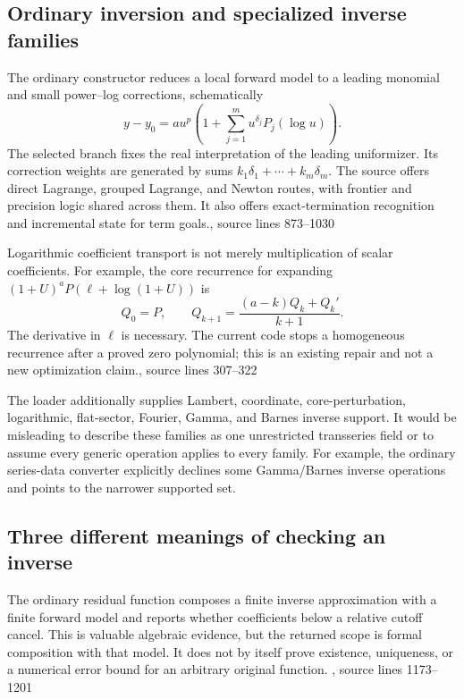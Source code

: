 \documentclass[11pt,letterpaper]{article}
\newcommand{\src}[2]{\cite{#1}, source lines #2}
\theoremstyle{definition}\newtheorem{definition}[proposition]{Definition}
\begin{document}
\subsection{Ordinary inversion and specialized inverse families}
The ordinary constructor reduces a local forward model to a leading monomial
and small power--log corrections, schematically
\begin{equation}\label{eq:inversemodel}
 y-y_0=a u^p\left(1+\sum_{j=1}^{m}u^{\delta_j}
                         P_j(\log u)\right).
\end{equation}
The selected branch fixes the real interpretation of the leading uniformizer.
Its correction weights are generated by sums $k_1\delta_1+\cdots+k_m\delta_m$.
The source offers direct Lagrange, grouped Lagrange, and Newton routes, with
frontier and precision logic shared across them. It also offers exact-termination
recognition and incremental state for term goals.\src{core}{873--1030}

Logarithmic coefficient transport is not merely multiplication of scalar
coefficients. For example, the core recurrence for expanding
$(1+U)^aP(\ell+\log(1+U))$ is
\begin{equation}
 Q_0=P,\qquad
 Q_{k+1}=\frac{(a-k)Q_k+Q_k'}{k+1}.
\end{equation}
The derivative in $\ell$ is necessary. The current code stops a homogeneous
recurrence after a proved zero polynomial; this is an existing repair and not
a new optimization claim.\src{core}{307--322}\cite{register}

The loader additionally supplies Lambert, coordinate, core-perturbation,
logarithmic, flat-sector, Fourier, Gamma, and Barnes inverse support. It would
be misleading to describe these families as one unrestricted transseries
field or to assume every generic operation applies to every family. For
example, the ordinary series-data converter explicitly declines some
Gamma/Barnes inverse operations and points to the narrower supported set.
\cite{core,operations}

\subsection{Three different meanings of checking an inverse}
The ordinary residual function composes a finite inverse approximation with
a finite forward model and reports whether coefficients below a relative
cutoff cancel. This is valuable algebraic evidence, but the returned scope is
formal composition with that model. It does not by itself prove existence,
uniqueness, or a numerical error bound for an arbitrary original function.
\src{core}{1173--1201}
\end{document}
